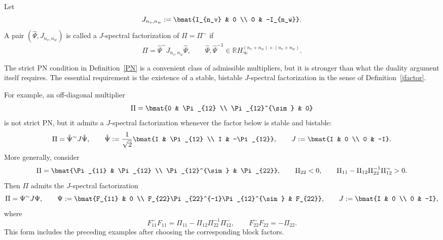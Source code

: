\begin{definition}\label{jfactor}
    Let
    \[
        J_{n_v,n_w}:=\bmat{I_{n_v} & 0 \\ 0 & -I_{n_w}}.
    \]
    A pair $(\hat{\Psi},J_{n_v,n_w})$ is called a $J$-spectral factorization of
    $\Pi=\Pi^{\sim}$ if
    \begin{equation}
        \Pi=\hat{\Psi}^{\sim}J_{n_v,n_w}\hat{\Psi},
        \qquad
        \hat{\Psi},\hat{\Psi}^{-1}\in
        \mathbb{R}H_\infty^{(n_v+n_w)\times(n_v+n_w)}.
    \end{equation}
\end{definition}

\begin{remark}
    The strict PN condition in Definition~\ref{PN} is a convenient class of admissible multipliers, but it is stronger than what the duality argument itself requires. The essential requirement is the existence of a stable, bistable $J$-spectral factorization in the sense of Definition~\ref{jfactor}.

    For example, an off-diagonal multiplier
    \[
        \Pi=\bmat{0 & \Pi_{12} \\ \Pi_{12}^{\sim} & 0}
    \]
    is not strict PN, but it admits a $J$-spectral factorization whenever the factor below is stable and bistable:
    \begin{equation}
        \Pi=\hat{\Psi}^{\sim}J\hat{\Psi},\qquad
        \hat{\Psi}:=\frac{1}{\sqrt{2}}\bmat{I & \Pi_{12} \\ I & -\Pi_{12}},
        \qquad
        J:=\bmat{I & 0 \\ 0 & -I}.
    \end{equation}
    More generally, consider
    \[
        \Pi=\bmat{\Pi_{11} & \Pi_{12} \\ \Pi_{12}^{\sim} & \Pi_{22}},
        \qquad
        \Pi_{22}<0,\qquad
        \Pi_{11}-\Pi_{12}\Pi_{22}^{-1}\Pi_{12}^{\sim}>0.
    \]
    Then $\Pi$ admits the $J$-spectral factorization
    \begin{equation}
        \Pi=\Psi^{\sim}J\Psi,\qquad
        \Psi:=\bmat{F_{11} & 0 \\ F_{22}\Pi_{22}^{-1}\Pi_{12}^{\sim} & F_{22}},
        \qquad
        J:=\bmat{I & 0 \\ 0 & -I},
    \end{equation}
    where
    \[
        F_{11}^{\sim}F_{11}
        =\Pi_{11}-\Pi_{12}\Pi_{22}^{-1}\Pi_{12}^{\sim},
        \qquad
        F_{22}^{\sim}F_{22}=-\Pi_{22}.
    \]
    This form includes the preceding examples after choosing the corresponding block factors.
\end{remark}

